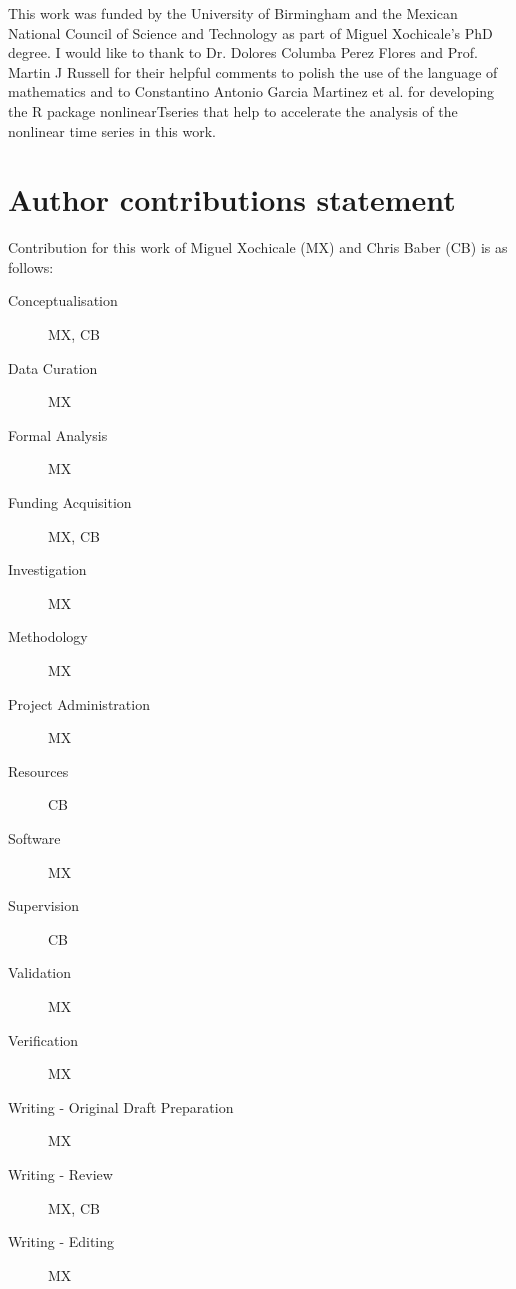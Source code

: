 \documentclass[fleqn,10pt]{wlscirep}
\begin{document}
This work was funded by the University of Birmingham and the 
Mexican National Council of Science and Technology as part of 
Miguel Xochicale's PhD degree. I would like to thank to Dr. Dolores 
Columba Perez Flores and Prof. Martin J Russell for their helpful 
comments to polish the use of the language of mathematics and to 
Constantino Antonio Garcia Martinez et al. for developing the R 
package nonlinearTseries that help to accelerate the 
analysis of the nonlinear time series in this work.

\section*{Author contributions statement}
Contribution for this work of 
Miguel Xochicale (MX) and Chris Baber (CB) is as follows:
\begin{description}
\item[Conceptualisation] MX, CB
\item[Data Curation] MX
\item[Formal Analysis] MX
\item[Funding Acquisition] MX, CB
\item[Investigation] MX
\item[Methodology] MX
\item[Project Administration] MX
\item[Resources] CB
\item[Software] MX
\item[Supervision] CB
\item[Validation] MX
\item[Verification] MX
\item[Writing - Original Draft Preparation] MX
\item[Writing - Review] MX, CB
\item[Writing - Editing] MX
\end{description}

%
%
%
%
\end{document}
